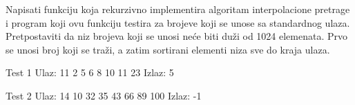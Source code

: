 \begin{Exercise}[label=407]
  Napisati funkciju koja rekurzivno implementira algoritam
  interpolacione pretrage i program koji ovu funkciju testira za
  brojeve koji se unose sa standardnog ulaza. Pretpostaviti da niz
  brojeva koji se unosi neće biti duži od 1024 elemenata. Prvo se
  unosi broj koji se traži, a zatim sortirani elementi niza sve do
  kraja ulaza.
\begin{miditest}
\begin{test}{Test 1}
Ulaz:   11 2 5 6 8 10 11 23
Izlaz:  5
\end{test}
\end{miditest}

\begin{miditest}
\begin{test}{Test 2}
Ulaz:   14 10 32 35 43 66 89 100
Izlaz:  -1  
\end{test}
\end{miditest}
  
\end{Exercise}

